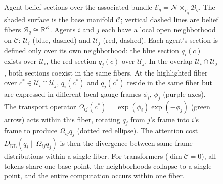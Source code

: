 \documentclass[11pt]{article}
\providecommand{\KL}{\operatorname{KL}}
\begin{document}
\begin{figure}[t]
\caption{%
Agent belief sections over the associated bundle
$\mathcal{E}_q = \mathcal{N} \times_{\rho_q} \mathcal{B}_q$.
The shaded surface is the base manifold $\mathcal{C}$;
vertical dashed lines are belief fibers $\mathcal{B}_q \cong \mathbb{R}^K$.
Agents $i$ and $j$ each have a local open neighborhood on $\mathcal{C}$:
$\mathcal{U}_i$ (blue, dashed) and $\mathcal{U}_j$ (red, dashed).
Each agent's section is defined only over its own neighborhood:
the blue section $q_i(c)$ exists over $\mathcal{U}_i$,
the red section $q_j(c)$ over $\mathcal{U}_j$.
In the overlap $\mathcal{U}_i \cap \mathcal{U}_j$,
both sections coexist in the same fibers.
At the highlighted fiber over $c^* \in \mathcal{U}_i \cap \mathcal{U}_j$,
$q_i(c^*)$ and $q_j(c^*)$ reside in the same fiber
but are expressed in different local gauge frames
$\phi_i$, $\phi_j$ (purple axes).
The transport operator
$\Omega_{ij}(c^*) = \exp(\phi_i)\exp(-\phi_j)$
(green arrow) acts within this fiber,
rotating $q_j$ from $j$'s frame into $i$'s frame
to produce $\Omega_{ij} q_j$ (dotted red ellipse).
The attention cost $D_{\mathrm{KL}}(q_i \| \Omega_{ij} q_j)$
is then the divergence between same-frame distributions within a single fiber.
For transformers ($\dim\mathcal{C} = 0$),
all tokens share one base point, the neighborhoods collapse to a single point,
and the entire computation occurs within one fiber.
}
\label{fig:bundle_sections_surface}
\end{figure}
\end{document}
